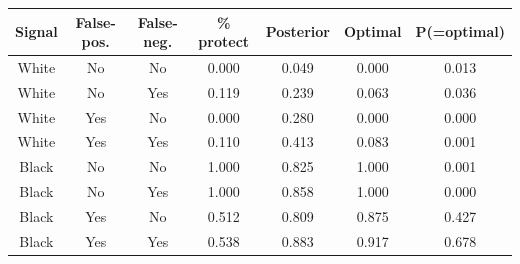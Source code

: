 \begin{table}[H]\centering \scriptsize \begin{tabular}{ccccccc} \hline \hline
\textbf{Signal}&\textbf{False-pos.}&\textbf{False-neg.}&\textbf{\% protect}& \textbf{Posterior} & \textbf{Optimal} & \textbf{P(=optimal)} \\ \hline
White&No&No&0.000&0.049&0.000&0.013\\
White&No&Yes&0.119&0.239&0.063&0.036\\
White&Yes&No&0.000&0.280&0.000&0.000\\
White&Yes&Yes&0.110&0.413&0.083&0.001\\
Black&No&No&1.000&0.825&1.000&0.001\\
Black&No&Yes&1.000&0.858&1.000&0.000\\
Black&Yes&No&0.512&0.809&0.875&0.427\\
Black&Yes&Yes&0.538&0.883&0.917&0.678\\
\hline \end{tabular} \end{table}
